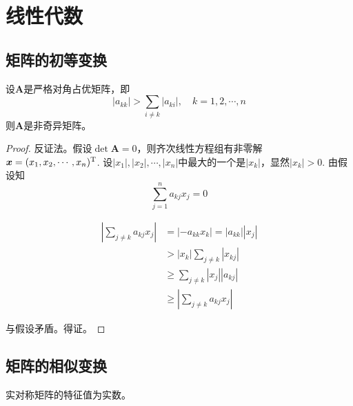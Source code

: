 \chapter{线性代数}

\section{矩阵的初等变换}

\begin{theorem}

    设$\boldsymbol{A}$是严格对角占优矩阵，即
    \[|a_{kk}| > \sum\limits_{i \neq k}{|a_{ki}|}, \quad k = 1, 2, \cdots , n\]
    则$\boldsymbol{A}$是非奇异矩阵。

\end{theorem}

\begin{proof}
    
    反证法。假设$\det \boldsymbol{A} = 0$，则齐次线性方程组有非零解$\boldsymbol{x} = (x_1, x_2, \cdots , x_n)^{\mathrm{T}}$.
    设$|x_1|, |x_2|, \cdots , |x_n|$中最大的一个是$|x_k|$，显然$|x_k| > 0$. 由假设知
    \[\sum\limits_{j = 1}^{n}{a_{kj}x_j}  = 0\]
    
    \begin{align*}
        \left| \sum\limits_{j \neq k}{a_{kj}x_j} \right| & = |-a_{kk}x_k| = |a_{kk}||x_j| \\ 
        & > |x_k| \sum\limits_{j \neq k}{|x_{kj}|} \\
        & \geq \sum\limits_{j \neq k}{|x_j||a_{kj}|} \\
        & \geq \left| \sum\limits_{j \neq k}{a_{kj}x_j} \right|
    \end{align*}

    与假设矛盾。得证。
    
\end{proof}

\section{矩阵的相似变换}

\begin{theorem}
    
    实对称矩阵的特征值为实数。

\end{theorem}

